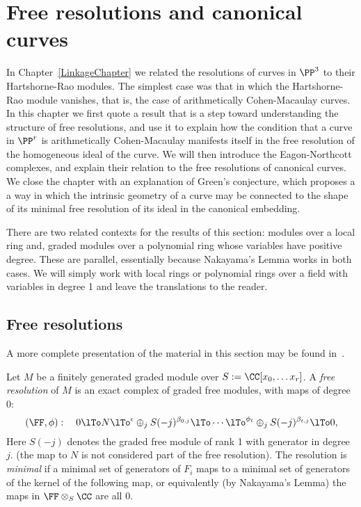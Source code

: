 

\chapter{Free resolutions and canonical curves}
\label{SyzygiesChapter}

\def\length{{\rm length}}

In Chapter~\ref{LinkageChapter} we related the resolutions of curves in $\PP^3$ to their Hartshorne-Rao modules. The
simplest case was that in which the Hartshorne-Rao module vanishes, that is, the case of arithmetically Cohen-Macaulay curves.
In this chapter we first quote a result that is a step toward understanding the structure of free resolutions, and use it to explain how the condition that a curve in $\PP^r$ is arithmetically Cohen-Macaulay manifests itself in the 
free resolution of the homogeneous ideal of the curve.  We will then introduce the Eagon-Northcott complexes, and explain their relation to the free resolutions of canonical curves. We close the chapter with an explanation of Green's conjecture, which proposes a a way in which the intrinsic geometry
of a curve may be connected to the shape of its minimal free resolution of its ideal in the canonical embedding.

\begin{remark}
 There are two related contexts for the results of this section:  modules over a local ring and, graded modules over a polynomial ring whose variables have positive degree. These are parallel, essentially because Nakayama's Lemma works in both cases. We will simply work with local rings or polynomial rings over a field with variables in degree 1 and leave the translations to the reader.\end{remark}

\section{Free resolutions}
A more complete presentation of the material in this section may be found in~\cite[Chapter 19]{Eisenbud1995}.


Let $M$ be a finitely generated graded module over $S := \CC[x_0, \dots x_r]$. A \emph{free resolution} of $M$ is an exact complex
of graded free modules, with maps of degree 0:
$$
(\FF, \phi):\quad 0\lTo N \lTo^\epsilon \oplus_jS(-j)^{\beta_{0,j}} \lTo\cdots
 \lTo^{\phi_t}\oplus_jS(-j)^{\beta_{t,j}}\lTo 0,
$$
Here $S(-j)$ denotes the graded free module of rank 1 with generator in degree $j$.
(the map to $N$ is not considered part of the free resolution). The resolution is \emph{minimal} if a minimal set of generators of $F_i$ maps to a minimal set of generators of the kernel of the following map,
or equivalently (by Nakayama's Lemma) the maps in $\FF\otimes_S \CC$ are all 0.

